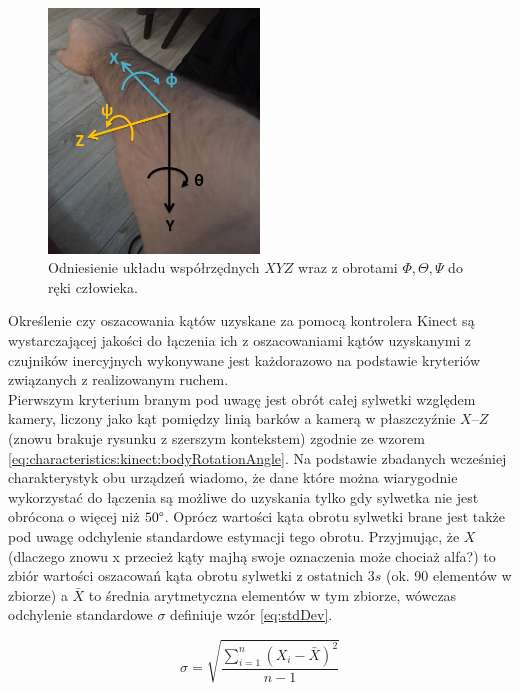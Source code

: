 \begin{figure}[!htb]
	\centering	
	\includegraphics[width=0.5\textwidth]{images/handAxes.jpg}	
	\caption{Odniesienie układu współrzędnych $XYZ$ wraz z obrotami $\Phi , \Theta , \Psi$ do ręki człowieka.}
	\label{fig:handAxes}
\end{figure}

Określenie czy oszacowania kątów uzyskane za pomocą kontrolera Kinect są wystarczającej jakości do łączenia ich z oszacowaniami kątów uzyskanymi z czujników inercyjnych wykonywane jest każdorazowo na podstawie kryteriów związanych z realizowanym ruchem. \\
Pierwszym kryterium branym pod uwagę jest obrót całej sylwetki względem kamery, liczony jako kąt pomiędzy linią barków a kamerą w płaszczyźnie $X$--$Z$ (znowu brakuje rysunku z szerszym kontekstem) zgodnie ze wzorem \eqref{eq:characteristics:kinect:bodyRotationAngle}. Na podstawie zbadanych wcześniej charakterystyk obu urządzeń wiadomo, że dane które można wiarygodnie wykorzystać do łączenia są możliwe do uzyskania tylko gdy sylwetka nie jest obrócona o więcej niż $50\degree$. Oprócz wartości kąta obrotu sylwetki brane jest także pod uwagę odchylenie standardowe estymacji tego obrotu. Przyjmując, że $X$ (dlaczego znowu x przecież kąty majhą swoje oznaczenia może chociaż alfa?) to zbiór wartości oszacowań kąta obrotu sylwetki z ostatnich $3s$ (ok. 90 elementów w zbiorze) a $\bar{X}$ to średnia arytmetyczna elementów w tym zbiorze, wówczas odchylenie standardowe $\sigma$ definiuje wzór \eqref{eq:stdDev}.

\begin{equation}
	\sigma = \sqrt{\frac{\sum_{i=1}^{n}{(X_i - \bar{X})^2}}{n-1}}
	\label{eq:stdDev}
\end{equation}

